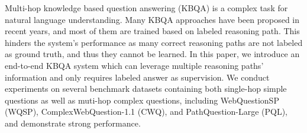  Multi-hop knowledge based question answering (KBQA) is a complex task for natural language understanding. Many KBQA approaches have been proposed in recent years, and most of them are trained based on labeled reasoning path. This hinders the system's performance as many correct reasoning paths are not labeled as ground truth, and thus they cannot be learned. In this paper, we introduce an end-to-end KBQA system which can leverage multiple reasoning paths' information and only requires labeled answer as supervision. We conduct experiments on several benchmark datasets containing both single-hop simple questions as well as muti-hop complex questions, including WebQuestionSP (WQSP), ComplexWebQuestion-1.1 (CWQ), and PathQuestion-Large (PQL), and demonstrate strong performance.